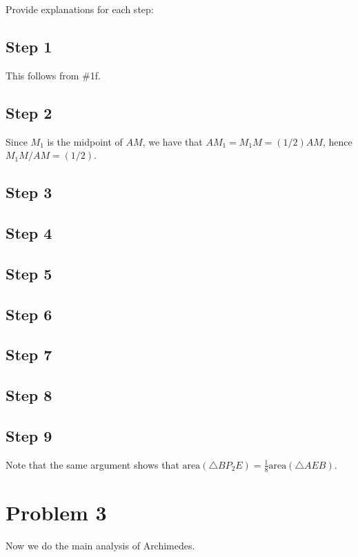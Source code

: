 \documentclass[letterpaper, 12pt]{amsart}
\theoremstyle{definition}  %
\begin{document}
	Provide explanations for each step:
		\subsection*{Step 1}
		This follows from \#1f.

		\subsection*{Step 2}
		Since $M_{1}$ is the midpoint of $AM$, we have that $AM_{1} = M_{1}M = (1/2)AM$, hence $M_{1}M/AM = (1/2)$.

		\subsection*{Step 3}

		\subsection*{Step 4}

		\subsection*{Step 5}

		\subsection*{Step 6}

		\subsection*{Step 7}

		\subsection*{Step 8}

		\subsection*{Step 9}
	Note that the same argument shows that $\text{area}(\triangle BP_{2}E) = \frac{1}{8}\text{area}(\triangle AEB)$.

	\section*{Problem 3}
	Now we do the main analysis of Archimedes.
\end{document}
